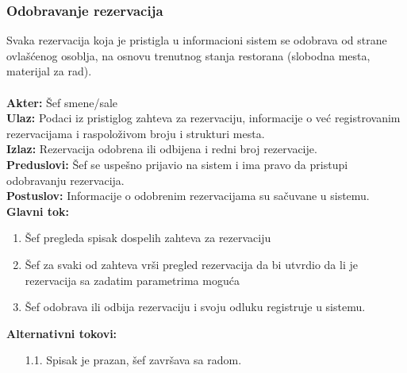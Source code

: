 \documentclass{article}
\begin{document}
\subsubsection{Odobravanje rezervacija}
Svaka rezervacija koja je pristigla u informacioni sistem se odobrava od strane ovlašćenog osoblja, na osnovu trenutnog stanja restorana (slobodna mesta, materijal za rad).\\\\
\textbf{Akter:} Šef smene/sale\\
\textbf{Ulaz:} Podaci iz pristiglog zahteva za rezervaciju, informacije o već registrovanim rezervacijama i raspoloživom broju i strukturi mesta.\\
\textbf{Izlaz:} Rezervacija odobrena ili odbijena i redni broj rezervacije.\\
\textbf{Preduslovi:} Šef se uspešno prijavio na sistem i ima pravo da pristupi odobravanju rezervacija.\\
\textbf{Postuslov:} Informacije o odobrenim rezervacijama su sačuvane u sistemu.\\
\textbf{Glavni tok:}
\begin{enumerate}
\item Šef pregleda spisak dospelih zahteva za rezervaciju
\item Šef za svaki od zahteva vrši pregled rezervacija da bi utvrdio da li je rezervacija sa zadatim parametrima moguća
\item Šef odobrava ili odbija rezervaciju i svoju odluku registruje u sistemu.\\
\end{enumerate}
\textbf{Alternativni tokovi:}\\
\begin{itemize}
\item [1.1.] Spisak je prazan, šef završava sa radom.
\end{itemize}
\end{document}

